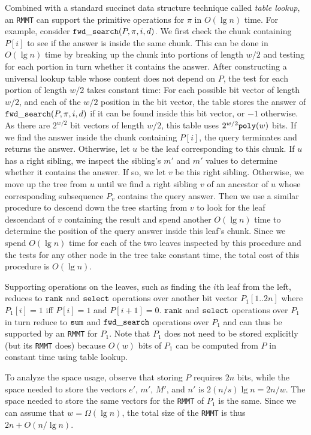 Combined with a standard succinct data structure technique called {\em table
  lookup}, an {\tt RMMT} can support the primitive operations for $\pi$ in
$O(\lg n)$ time.
For example, consider $\mathtt{fwd\_search}(P,\pi,i,d)$.
We first check the chunk containing $P[i]$ to see if the answer is inside the
same chunk.
This can be done in $O(\lg n)$ time by breaking up the chunk into portions
of length $w/2$ and testing for each portion in turn whether it contains the
answer.
After constructing a universal lookup table whose content does not depend on
$P$, the test for each portion of length $w/2$ takes constant time: For each
possible bit vector of length $w/2$, and each of the $w/2$ position in the bit
vector, the table stores the answer of $\mathtt{fwd\_search}(P,\pi,i,d)$ if it can be
found inside this bit vector, or $-1$ otherwise.
As there are $2^{w/2}$ bit vectors of length $w/2$, this table uses
$2^{w/2}\mathtt{poly}(w)$ bits.
If we find the answer inside the chunk containing $P[i]$, the query terminates
and returns the answer.
Otherwise, let $u$ be the leaf corresponding to this chunk.
If $u$ has a right sibling, we inspect the sibling's $m'$ and $m'$ values to
determine whether it contains the answer.
If so, we let $v$ be this right sibling.
Otherwise, we move up the tree from $u$ until we find a right sibling $v$ of
an ancestor of $u$ whose corresponding subsequence $P_v$ contains the query
answer.
Then we use a similar procedure to descend down the tree starting from $v$ to
look for the leaf descendant of $v$ containing the result and spend another
$O(\lg n)$ time to determine the position of the query answer inside this leaf's
chunk.
Since we spend $O(\lg n)$ time for each of the two leaves inspected by this
procedure and the tests for any other node in the tree take constant time,
the total cost of this procedure is $O(\lg n)$.

Supporting operations on the leaves, such as finding the $i$th leaf from the
left, reduces to $\mathtt{rank}$ and $\mathtt{select}$ operations over another bit vector
$P_1[1..2n]$ where $P_1[i] = 1$ iff $P[i] = 1$ and $P[i+1] = 0$.
$\mathtt{rank}$ and $\mathtt{select}$ operations over $P_1$ in turn reduce to
$\mathtt{sum}$ and $\mathtt{fwd\_search}$ operations over $P_1$ and can thus be supported
by an {\tt RMMT} for $P_1$.
Note that $P_1$ does not need to be stored explicitly (but its {\tt RMMT} does)
because $O(w)$ bits of $P_1$ can be computed from $P$ in constant time using
table lookup.

To analyze the space usage, observe that storing $P$ requires $2n$ bits, while
the space needed to store the vectors $e'$, $m'$, $M'$, and $n'$ is
$2(n/s) \lg n = 2n/w$.
The space needed to store the same vectors for the {\tt RMMT} of $P_1$ is
the same.
Since we can assume that $w = \Omega(\lg n)$, the total size of the {\tt RMMT}
is thus $2n + O(n / \lg n)$.
